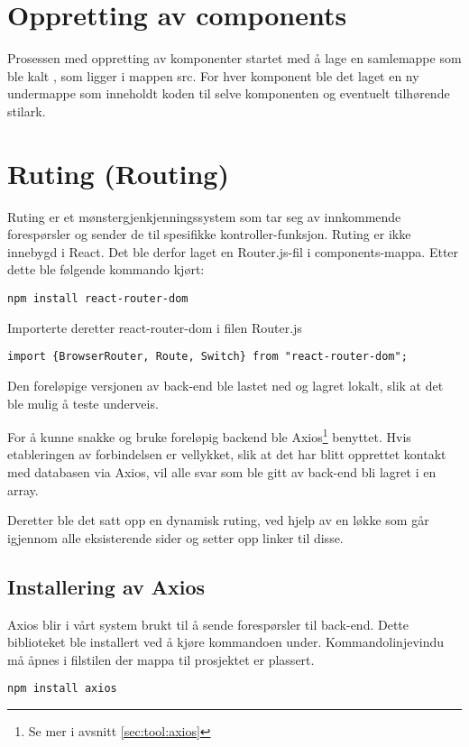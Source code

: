 \section{Oppretting av components}
Prosessen med oppretting av komponenter startet med å lage en samlemappe som ble kalt , som ligger i mappen src. For hver komponent ble det laget en ny undermappe som inneholdt koden til selve komponenten og eventuelt tilhørende stilark.

\section{Ruting (Routing)}
Ruting er et mønstergjenkjenningssystem som tar seg av innkommende forespørsler og sender de til spesifikke kontroller-funksjon. Ruting er ikke innebygd i React. Det ble derfor laget en Router.js-fil i components-mappa. Etter dette ble følgende kommando kjørt:

\begin{lstlisting}
npm install react-router-dom
\end{lstlisting}

Importerte deretter react-router-dom i filen Router.js

\begin{lstlisting}
import {BrowserRouter, Route, Switch} from "react-router-dom";
\end{lstlisting}

Den foreløpige versjonen av back-end ble lastet ned og lagret lokalt, slik at det ble mulig å teste underveis.

For å kunne snakke og bruke foreløpig backend ble Axios\footnote{Se mer i avsnitt \ref{sec:tool:axios}} benyttet. Hvis etableringen av forbindelsen er vellykket, slik at det har blitt opprettet kontakt med databasen via Axios, vil alle svar som ble gitt av back-end bli lagret i en array. 

Deretter ble det satt opp en dynamisk ruting, ved hjelp av en løkke som går igjennom alle eksisterende sider og setter opp linker til disse.

\subsection{Installering av Axios}
Axios blir i vårt system brukt til å sende forespørsler til back-end. Dette biblioteket ble installert ved å kjøre kommandoen under.  Kommandolinjevindu må åpnes i filstilen der mappa til prosjektet er plassert.
\begin{lstlisting}
npm install axios
\end{lstlisting}


